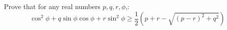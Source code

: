 Prove that for any real numbers $p,q,r,\phi$,:
$$\cos^2\phi+q \sin \phi \cos \phi +r\sin^2 \phi \ge \frac12 (p+r-\sqrt{(p-r)^2+q^2})$$